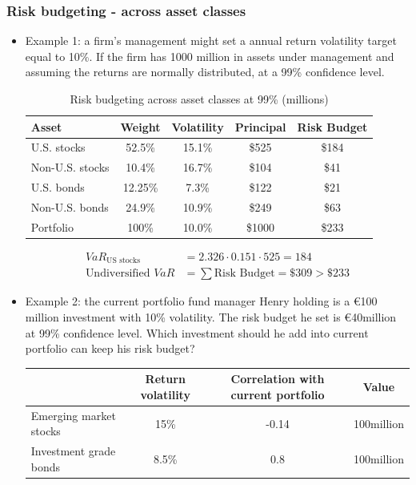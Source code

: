 \subsubsection{Risk budgeting - across asset classes}
\begin{itemize}
\item Example 1: a firm's management might set a annual return volatility target equal to 10\%. If the firm has 1000 million in assets under management and assuming the returns are normally distributed, at a 99\% confidence level.

\begin{table}[h]
    \centering
    \caption{Risk budgeting across asset classes at 99\% (millions)}
    \begin{tabular}{lcccc}
        \toprule
        Asset & Weight & Volatility & Principal & Risk Budget \\
        \midrule
        U.S. stocks & 52.5\% & 15.1\% & \$525 & \$184 \\
        Non-U.S. stocks & 10.4\% & 16.7\% & \$104 & \$41 \\
        U.S. bonds & 12.25\% & 7.3\% & \$122 & \$21 \\
        Non-U.S. bonds & 24.9\% & 10.9\% & \$249 & \$63 \\
        Portfolio & 100\% & 10.0\% & \$1000 & \$233 \\
        \bottomrule
    \end{tabular}
\end{table}

\begin{align*}
VaR_{\text{US stocks}} &= 2.326 \cdot 0.151 \cdot 525 = 184 \\
\text{Undiversified } VaR &= \sum \text{Risk Budget} = \$309 > \$233
\end{align*}

\item Example 2: the current portfolio fund manager Henry holding is a €100 million investment with 10\% volatility. The risk budget he set is €40million at 99\% confidence level. Which investment should he add into current portfolio can keep his risk budget?

\begin{tabular}{@{}lccc@{}}
    \toprule
    & Return volatility & Correlation with current portfolio & Value \\
    \midrule
    Emerging market stocks & 15\% & -0.14 & 100million \\
    Investment grade bonds & 8.5\% & 0.8 & 100million \\
    \bottomrule
\end{tabular}


\end{itemize}
